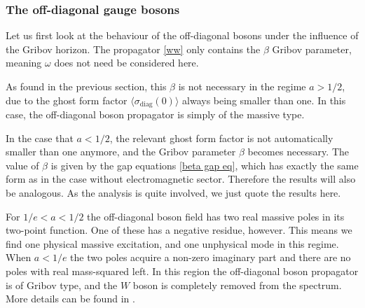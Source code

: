\subsubsection{The off-diagonal gauge bosons} \label{sect4}
Let us first look at the behaviour of the off-diagonal bosons under the influence of the Gribov horizon. The propagator \eqref{ww} only contains the $\beta$ Gribov parameter, meaning $\omega$ does not need be considered here.

As found in the previous section, this $\beta$ is not necessary in the regime $a>1/2$, due to the ghost form factor $\langle\sigma_\text{diag}(0)\rangle$ always being smaller than one. In this case, the off-diagonal boson propagator is simply of the massive type.

In the case that $a<1/2$, the relevant ghost form factor is not automatically smaller than one anymore, and the Gribov parameter $\beta$ becomes necessary. The value of $\beta$ is given by the gap equations \eqref{beta gap eq}, which has exactly the same form as in the case without electromagnetic sector. Therefore the results will also be analogous. As the analysis is quite involved, we just quote the results here.

For $1/e<a<1/2$ the off-diagonal boson field has two real massive poles in its two-point function. One of these has a negative residue, however. This means we find one physical massive excitation, and one unphysical mode in this regime. When $a<1/e$ the two poles acquire a non-zero imaginary part and there are no poles with real mass-squared left. In this region the off-diagonal boson propagator is of Gribov type, and the $W$ boson is completely removed from the spectrum. More details can be found in \cite{Capri:2012ah}.


